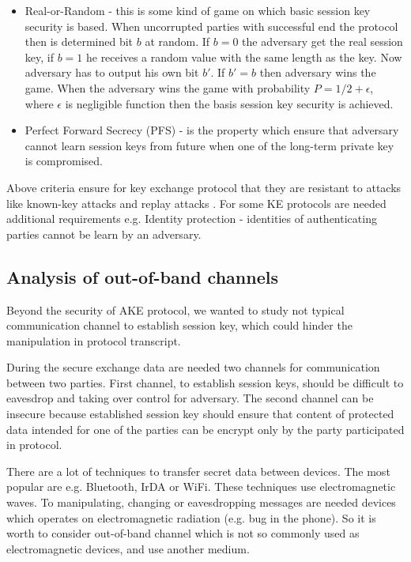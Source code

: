 \documentclass[11pt,titlepage]{article}
\theoremstyle{plain}
\begin{document}
\begin{itemize}
	\item Real-or-Random - this is some kind of game on which basic session key security is based. When uncorrupted parties with successful end the protocol then is determined bit $b$ at random. If $b=0$ the adversary get the real session key, if $b = 1$ he receives a random value with the same length as the key. Now adversary has to output his own bit $b'$. If $b' = b$ then adversary wins the game. When the adversary wins the game with probability $P = 1/2+\epsilon$, where $\epsilon$ is negligible function then the basis session key security is achieved.
	\item Perfect Forward Secrecy (PFS) - is the property which ensure that adversary cannot learn session keys from future when one of the long-term private key is compromised.
\end{itemize}

Above criteria ensure for key exchange protocol that they are resistant to attacks like known-key attacks and replay attacks \cite{cryptography}. For some KE protocols are needed additional requirements e.g. Identity protection - identities of authenticating parties cannot be learn by an adversary.

\subsection{Analysis of out-of-band channels}
Beyond the security of AKE protocol, we wanted to study not typical communication channel to establish session key, which could hinder the manipulation in protocol transcript.

\vspace{5mm}

During the secure exchange data are needed two channels for communication between two parties. First channel, to establish session keys, should be difficult to eavesdrop and taking over control for adversary. The second channel can be insecure because established session key should ensure that content of protected data intended for one of the parties can be encrypt only by the party participated in protocol. 


There are a lot of techniques to transfer secret data between devices. The most popular are e.g. Bluetooth, IrDA or WiFi. These techniques use electromagnetic waves. To manipulating, changing or eavesdropping messages are needed devices which operates on electromagnetic radiation (e.g. bug in the phone). So it is worth to consider out-of-band channel which is not so commonly used as electromagnetic devices, and use another medium.
\end{document}
